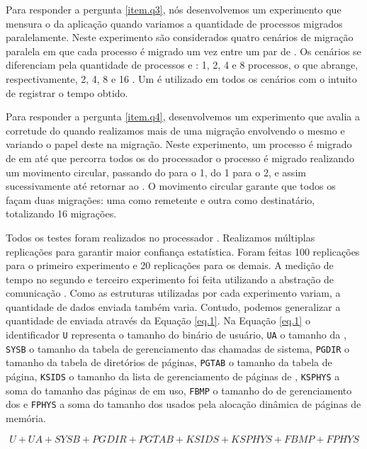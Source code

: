 Para responder a pergunta \ref{item.q3}, nós desenvolvemos um experimento que mensura o \downtime da aplicação quando variamos a quantidade de processos migrados paralelamente. Neste experimento são considerados quatro cenários de migração paralela em que cada processo é migrado um vez entre um par de \clusters. Os cenários se diferenciam pela quantidade de processos e \clusters: 1, 2, 4 e 8 processos, o que abrange, respectivamente, 2, 4, 8 e 16 \cclusters. Um \iocluster é utilizado em todos os cenários com o intuito de registrar o tempo obtido.

Para responder a pergunta \ref{item.q4}, desenvolvemos um experimento que avalia a corretude do \daemon quando realizamos mais de uma migração envolvendo o mesmo \cluster e variando o papel deste na migração. Neste experimento, um processo é migrado de \cluster em \cluster até que percorra todos os \cclusters do processador \ie o processo é migrado realizando um movimento circular, passando do  para o 1, do 1 para o 2, e assim sucessivamente até retornar ao . O movimento circular garante que todos os \clusters façam duas migrações: uma como remetente e outra como destinatário, totalizando 16 migrações.

Todos os testes foram realizados no processador \mppa. Realizamos múltiplas replicações para garantir maior confiança estatística. Foram feitas 100 replicações para o primeiro experimento e 20 replicações para os demais. A medição de tempo no segundo e terceiro experimento foi feita utilizando a abstração de comunicação \sync. Como as estruturas utilizadas por cada experimento variam, a quantidade de dados enviada também varia. Contudo, podemos generalizar a quantidade de \bytes enviada através da Equação \ref{eq.1}. Na Equação \ref{eq.1} o identificador \texttt{U} representa o tamanho do binário de usuário, \texttt{UA} o tamanho da \uarea, \texttt{SYSB} o tamanho da tabela de gerenciamento das chamadas de sistema, \texttt{PGDIR} o tamanho da tabela de diretórios de páginas, \texttt{PGTAB} o tamanho da tabela de página, \texttt{KSIDS} o tamanho da lista de gerenciamento de páginas de , \texttt{KSPHYS} a soma do tamanho das páginas de  em uso, \texttt{FBMP} o tamanho do \bitmap de gerenciamento dos \frames e \texttt{FPHYS} a soma do tamanho dos \frames usados pela alocação dinâmica de páginas de memória.

\begin{equation}\label{eq.1}
    U + UA + SYSB + PGDIR + PGTAB + KSIDS + KSPHYS + FBMP + FPHYS
\end{equation}

